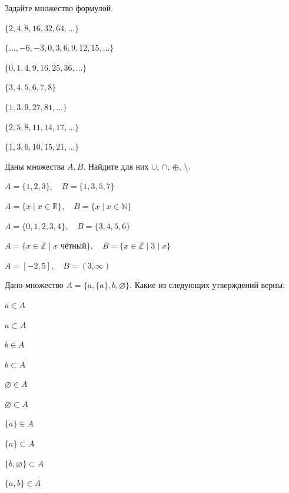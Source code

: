 \documentclass[a4paper,12pt,oneside]{article}
\begin{document}

Задайте множество формулой.
\begin{numlist}
    \item $\{2,4,8,16,32,64,\ldots\}$
    \item $\{\ldots,-6,-3,0,3,6,9,12,15,\ldots\}$
    \item $\{0,1,4,9,16,25,36,\ldots\}$
    \item $\{3,4,5,6,7,8\}$
    \item $\{1,3,9,27,81,\ldots\}$
    \item $\{2,5,8,11,14,17,\ldots\}$
    \item $\{1,3,6,10,15,21,\ldots\}$
\end{numlist}

Даны множества $A,B$. Найдите для них $\cup$, $\cap$, $\oplus$, $\setminus$.
\begin{numlist}
    \item $A=\{1,2,3\},\quad B=\{1,3,5,7\}$
    \item $A=\{x \mid x\in\mathbb{R}\},\quad B=\{x \mid x\in\mathbb{N}\}$
    \item $A=\{0,1,2,3,4\},\quad B=\{3,4,5,6\}$
    \item $A=\{x\in\mathbb{Z}\mid x \text{ чётный}\},\quad B=\{x\in\mathbb{Z}\mid 3\mid x\}$
    \item $A=[-2,5],\quad B=(3,\infty)$
\end{numlist}

Дано множество $A=\{a,\{a\},b,\varnothing\}$. Какие из следующих утверждений верны:
\begin{numlist}
    \item $a \in A$
    \item $a \subset A$
    \item $b \in A$
    \item $b \subset A$
    \item $\varnothing \in A$
    \item $\varnothing \subset A$
    \item $\{a\}\in A$
    \item $\{a\}\subset A$
    \item $\{b,\varnothing\}\subset A$
    \item $\{a,b\}\in A$
\end{numlist}

\clearpage
\end{document}
